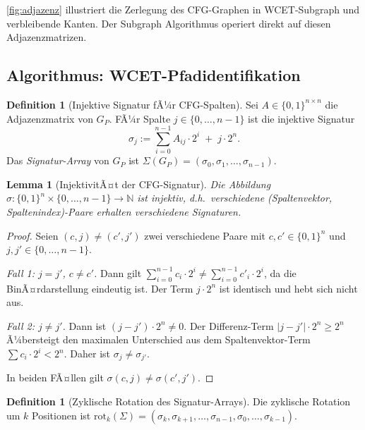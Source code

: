 ﻿\documentclass[a4paper,12pt]{article}
\theoremstyle{plain}
\newtheorem{lemma}[theorem]{Lemma}
\theoremstyle{definition}
\newtheorem{definition}[theorem]{Definition}
\theoremstyle{remark}
\begin{document}
\cref{fig:adjazenz} illustriert die Zerlegung des CFG-Graphen in
WCET-Subgraph und verbleibende Kanten. Der Subgraph Algorithmus
operiert direkt auf diesen Adjazenzmatrizen.

\subsection{Algorithmus: WCET-Pfadidentifikation}\label{ssec:wcet_algo}

\begin{definition}[Injektive Signatur fÃ¼r CFG-Spalten]\label{def:cfg_sig}
Sei $A \in \{0,1\}^{n \times n}$ die Adjazenzmatrix von $G_P$.
FÃ¼r Spalte $j \in \{0,\ldots,n-1\}$ ist die injektive Signatur
\[
  \sigma_j := \sum_{i=0}^{n-1} A_{ij} \cdot 2^i \;+\; j \cdot 2^n.
\]
Das \emph{Signatur-Array} von $G_P$ ist
$\Sigma(G_P) = (\sigma_0, \sigma_1, \ldots, \sigma_{n-1})$.
\end{definition}

\begin{lemma}[InjektivitÃ¤t der CFG-Signatur]\label{lem:cfg_injektiv}
Die Abbildung $\sigma: \{0,1\}^n \times \{0,\ldots,n-1\} \to \mathbb{N}$
ist injektiv, d.h.\ verschiedene (Spaltenvektor, Spaltenindex)-Paare
erhalten verschiedene Signaturen.
\end{lemma}
\begin{proof}
Seien $(c, j) \neq (c', j')$ zwei verschiedene Paare mit
$c, c' \in \{0,1\}^n$ und $j,j' \in \{0,\ldots,n-1\}$.

\emph{Fall 1: $j = j'$, $c \neq c'$.}
Dann gilt $\sum_{i=0}^{n-1} c_i \cdot 2^i \neq \sum_{i=0}^{n-1} c'_i \cdot 2^i$,
da die BinÃ¤rdarstellung eindeutig ist. Der Term $j \cdot 2^n$ ist identisch
und hebt sich nicht aus.

\emph{Fall 2: $j \neq j'$.}
Dann ist $(j-j') \cdot 2^n \neq 0$. Der Differenz-Term $|j-j'| \cdot 2^n \geq 2^n$
Ã¼bersteigt den maximalen Unterschied aus dem Spaltenvektor-Term
$\sum c_i \cdot 2^i < 2^n$. Daher ist $\sigma_j \neq \sigma_{j'}$.

In beiden FÃ¤llen gilt $\sigma(c,j) \neq \sigma(c',j')$.
\end{proof}

\begin{definition}[Zyklische Rotation des Signatur-Arrays]\label{def:rotation}
Die zyklische Rotation um $k$ Positionen ist
$\mathrm{rot}_k(\Sigma) = (\sigma_k, \sigma_{k+1}, \ldots, \sigma_{n-1}, \sigma_0, \ldots, \sigma_{k-1})$.
\end{definition}
\end{document}
